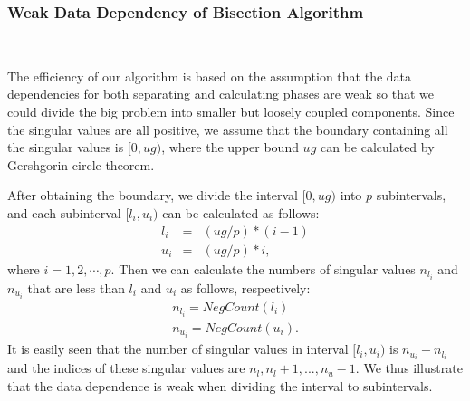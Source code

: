 \subsubsection{Weak Data Dependency of Bisection Algorithm}
~

The efficiency of our algorithm is based on the assumption that the data dependencies for both separating and calculating phases are weak so that we could divide the big problem into smaller but loosely coupled components. Since the singular values are all positive, we assume that the boundary containing all the singular values is $[0, ug)$, where the upper bound $ug$ can be calculated by Gershgorin circle theorem\cite{gershgorin}.

After obtaining the boundary, we divide the interval $[0,ug)$ into $p$ subintervals, and each subinterval $[l_i,u_i)$ can be calculated as follows:
\begin{eqnarray}
l_i &=& (ug/p) * (i-1)\\
u_i &=& (ug/p) * i ,
\end{eqnarray}
where $i = 1, 2, \cdots, p$. Then we can calculate the numbers of singular values $n_{l_i}$ and $n_{u_i}$ that are less than $l_i$ and $u_i$ as follows, respectively:
\begin{eqnarray}
 n_{l_i} = NegCount(l_i) \\
 n_{u_i} = NegCount(u_i) .
\end{eqnarray}
It is easily seen that the number of singular values in interval $[l_i,u_i)$ is $n_{u_i} - n_{l_i}$ and the indices of these singular values are $n_l, n_l+1, ..., n_u-1$. 
We thus illustrate that the data dependence is weak when dividing the interval
to subintervals.

